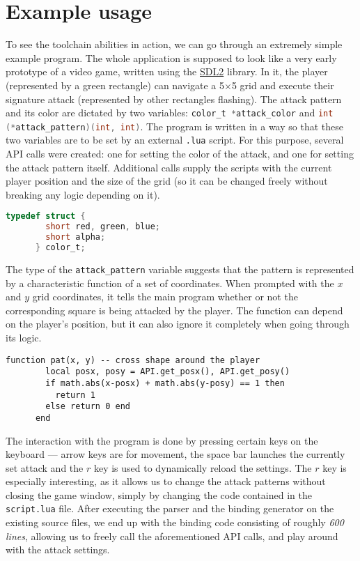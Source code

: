 \documentclass[polish, english]{iithesis}
\begin{document}
  \section{Example usage}
    To see the toolchain abilities in action, we can go through an extremely simple example program.
    The whole application is supposed to look like a very early prototype of a video game, written using the \href{https://www.libsdl.org/}{SDL2} library.
    In it, the player (represented by a green rectangle) can navigate a 5$\times$5 grid and execute their signature attack (represented by other rectangles flashing).
    The attack pattern and its color are dictated by two variables: \lstinline[language=c]|color_t *attack_color| and \lstinline[language=c]|int (*attack_pattern)(int, int)|.
    The program is written in a way so that these two variables are to be set by an external \texttt{.lua} script.
    For this purpose, several API calls were created: one for setting the color of the attack, and one for setting the attack pattern itself.
    Additional calls supply the scripts with the current player position and the size of the grid (so it can be changed freely without breaking any logic depending on it).
    \begin{lstlisting}[language=c, caption=\texttt{color\_t type definition}]
      typedef struct {
        short red, green, blue;
        short alpha;
      } color_t;
    \end{lstlisting}

    The type of the \texttt{attack\_pattern} variable suggests that the pattern is represented by a characteristic function of a set of coordinates.
    When prompted with the $x$ and $y$ grid coordinates, it tells the main program whether or not the corresponding square is being attacked by the player.
    The function can depend on the player's position, but it can also ignore it completely when going through its logic.
    \begin{lstlisting}[language={[5.2]Lua}, caption=Example pattern dictating function]
      function pat(x, y) -- cross shape around the player
        local posx, posy = API.get_posx(), API.get_posy()
        if math.abs(x-posx) + math.abs(y-posy) == 1 then 
          return 1
        else return 0 end
      end 
    \end{lstlisting}

    The interaction with the program is done by pressing certain keys on the keyboard --- arrow keys are for movement, the space bar launches the currently set attack and the $r$ key is used to dynamically reload the settings.
    The $r$ key is especially interesting, as it allows us to change the attack patterns without closing the game window, simply by changing the code contained in the \texttt{script.lua} file.
    After executing the parser and the binding generator on the existing source files, we end up with the binding code consisting of roughly \textit{600 lines}, allowing us to freely call the aforementioned API calls, and play around with the attack settings.
\end{document}
